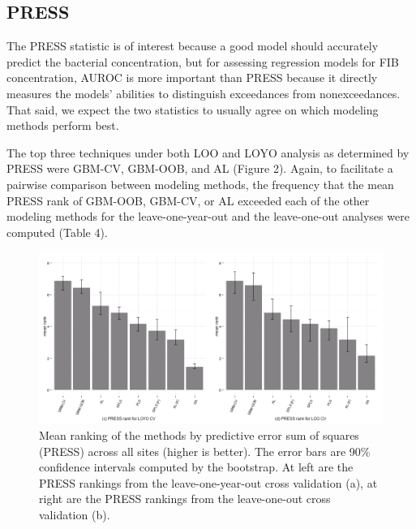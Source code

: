 \subsection{PRESS}\label{press}

The PRESS statistic is of interest because a good model should
accurately predict the bacterial concentration, but for assessing
regression models for FIB concentration, AUROC is more important than
PRESS because it directly measures the models' abilities to distinguish
exceedances from nonexceedances. That said, we expect the two statistics
to usually agree on which modeling methods perform best.

The top three techniques under both LOO and LOYO analysis as determined
by PRESS were GBM-CV, GBM-OOB, and AL (Figure 2). Again, to facilitate a
pairwise comparison between modeling methods, the frequency that the
mean PRESS rank of GBM-OOB, GBM-CV, or AL exceeded each of the other
modeling methods for the leave-one-year-out and the leave-one-out
analyses were computed (Table 4).

\begin{figure}[htbp]
\centering
\includegraphics{figure/press-barchart.png}
\caption{Mean ranking of the methods by predictive error sum of squares
(PRESS) across all sites (higher is better). The error bars are 90\%
confidence intervals computed by the bootstrap. At left are the PRESS
rankings from the leave-one-year-out cross validation (a), at right are
the PRESS rankings from the leave-one-out cross validation (b).}
\end{figure}

